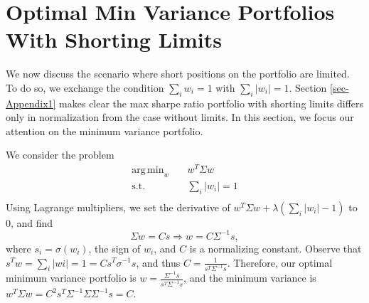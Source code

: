 \documentclass[10pt,twoside,titlepage]{article}   %
\DeclareMathOperator*{\argmin}{arg\,min}
\begin{document}
\section{Optimal Min Variance Portfolios With Shorting Limits}\label{sec-Appendix2}
We now discuss the scenario where short positions on the portfolio are limited. 
To do so, we exchange the condition $\sum_i w_i = 1$ with $\sum_i |w_i| = 1$.
Section \ref{sec-Appendix1} makes clear the max sharpe ratio portfolio with shorting limits differs only in normalization from the case without limits. 
In this section, we focus our attention on the minimum variance portfolio.

We consider the problem
\begin{equation}
\begin{aligned}
\argmin_{w} \quad & w^T \Sigma w \\
\textrm{s.t.} \quad & \sum_i |w_i| = 1\\
\end{aligned}
\end{equation}
Using Lagrange multipliers, we set the derivative of $w^T \Sigma w + \lambda ( \sum_i |w_i| - 1 )$ to $0$, and find
\[
\Sigma w = Cs \Rightarrow w = C\Sigma^{-1}s,
\]
where $s_i = \sigma(w_i)$, the sign of $w_i$, 
and $C$ is a normalizing constant. 
Observe that $s^T w = \sum_i |wi| = 1 = Cs^T\sigma^{-1}s$, 
and thus $C = \frac{1}{s^T\Sigma^{-1}s}$. 
Therefore, our optimal minimum variance portfolio is $w = \frac{\Sigma^{-1}s}{s^T\Sigma^{-1}s}$, 
and the minimum variance is $w^T \Sigma w = C^2 s^T \Sigma^{-1}\Sigma \Sigma^{-1}s = C$.
\end{document}
